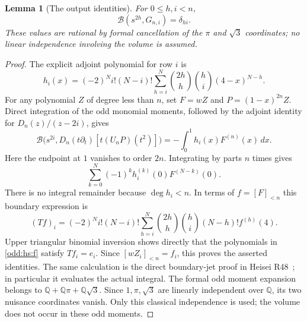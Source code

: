 \documentclass[11pt,a4paper]{article}
\numberwithin{equation}{section}
\newtheorem{lemma}[theorem]{Lemma}
\theoremstyle{definition}\newtheorem{definition}[theorem]{Definition}
\theoremstyle{remark}\newtheorem{remark}[theorem]{Remark}
\begin{document}
\begin{lemma}[The output identities]\label{odd:hs:output}
For $0\le h,i<n$,
\[
 \mathcal B(s^{2h},G_{n,i})=\delta_{hi}.
\]
These values are rational by formal cancellation of the $\pi$ and $\sqrt3$
coordinates; no linear independence involving the volume is assumed.
\end{lemma}
\begin{proof}
The explicit adjoint polynomial for row $i$ is
\[
 h_i(x)=(-2)^Ni!(N-i)!\sum_{h=i}^N
             \binom{2h}{h}\binom hi(4-x)^{N-h}.
\]
For any polynomial $Z$ of degree less than $n$, set $F=wZ$ and
$P=(1-x)^{2n}Z$. Direct integration of the odd monomial moments, followed
by the adjoint identity for $D_n(z)/(z-2i)$, gives
\[
 \mathcal B\bigl(s^{2i},D_n(t\partial_t)[t(U_nP)(t^2)]\bigr)
       =-\int_0^1 h_i(x)F^{(n)}(x)\,dx.
\]
Here the endpoint at $1$ vanishes to order $2n$. Integrating by parts $n$
times gives
\[
 \sum_{k=0}^N(-1)^kh_i^{(k)}(0)F^{(N-k)}(0).
\]
There is no integral remainder because $\deg h_i<n$. In terms of
$f=[F]_{<n}$ this boundary expression is
\begin{equation}\label{odd:hs:T}
 (Tf)_i=(-2)^Ni!(N-i)!\sum_{h=i}^N
      \binom{2h}{h}\binom hi(N-h)!f^{(h)}(4).
\end{equation}
Upper triangular binomial inversion shows directly that the polynomials
in \eqref{odd:hs:f} satisfy $Tf_i=e_i$. Since $[wZ_i]_{<n}=f_i$, this proves
the asserted identities. The same calculation is the direct boundary-jet
proof in Heisei R48~\cite{H48}; in particular it evaluates the actual integral.
The formal odd moment expansion belongs to
$\mathbb Q+\mathbb Q\pi+\mathbb Q\sqrt3$. Since
$1,\pi,\sqrt3$ are linearly independent over $\mathbb Q$, its two
nuisance coordinates vanish. Only this classical independence is used;
the volume does not occur in these odd moments.
\end{proof}
\end{document}
